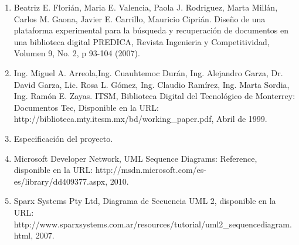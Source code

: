 %
%

\begin{enumerate}
	\item Beatriz E. Florián, Maria E.
    Valencia, Paola J. Rodriguez, Marta Millán, Carlos M. Gaona, Javier E. Carrillo,
    Mauricio Ciprián. Diseño de una plataforma experimental para la búsqueda y
    recuperación de documentos en una biblioteca digital PREDICA,  Revista Ingenieria y
    Competitividad, Volumen 9, No. 2, p 93-104 (2007).
                
    \item Ing. Miguel A. Arreola,Ing. Cuauhtemoc Durán, Ing. Alejandro Garza,
    Dr. David Garza, Lic. Rosa L. Gómez, Ing. Claudio Ramírez, Ing. Marta Sordia,
    Ing. Ramón E. Zayas. ITSM, Biblioteca Digital del Tecnológico de Monterrey: Documentos
    Tec, Disponible en la URL: http://biblioteca.mty.itesm.mx/bd/working\_paper.pdf,
    Abril de 1999.                
                
    \item Especificación del proyecto.
    
    \item Microsoft Developer Network, UML Sequence Diagrams: Reference, disponible en la URL:
    http://msdn.microsoft.com/es-es/library/dd409377.aspx, 2010.
    
    \item Sparx Systems Pty Ltd, Diagrama de Secuencia UML 2, disponible en la URL:\\
    http://www.sparxsystems.com.ar/resources/tutorial/uml2\_sequencediagram.html, 2007.
\end{enumerate}            

%
